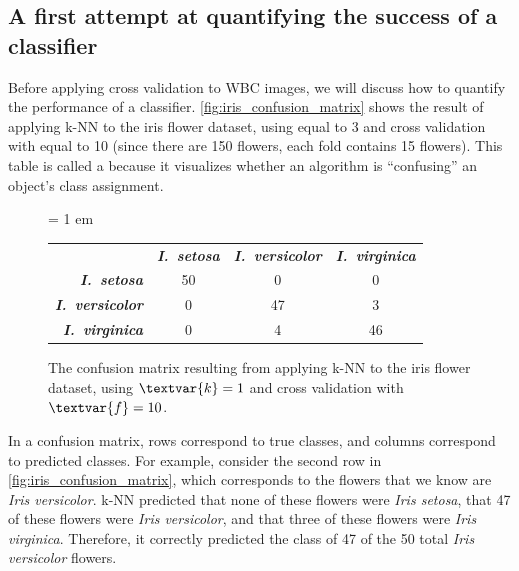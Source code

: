 \FloatBarrier
{}
\subsection{A first attempt at quantifying the success of a classifier}

Before applying cross validation to WBC images, we will discuss how to quantify the performance of a classifier. \autoref{fig:iris_confusion_matrix} shows the result of applying k-NN to the iris flower dataset, using  equal to 3 and cross validation with  equal to 10 (since there are 150 flowers, each fold contains 15 flowers). This table is called a  because it visualizes whether an algorithm is ``confusing'' an object's class assignment.\\

\begin{figure}[h]
\centering
\tabcolsep = 1 em
\mySfFamily
{}
\begin{tabular}{r c c c}
\rowcolor{gray!50}
& \textbf{\textit{I.~setosa}} & \textbf{\textit{I.~versicolor}} & \textbf{\textit{I.~virginica}} \\
\textbf{\textit{I.~setosa}} & 50 & \phantom{5}0 & \phantom{5}0 \\
\textbf{\textit{I.~versicolor}} & \phantom{5}0 & 47 & \phantom{5}3 \\
\textbf{\textit{I.~virginica}} & \phantom{5}0 & \phantom{5}4 & 46
\end{tabular}
\caption{The confusion matrix resulting from applying k-NN to the iris flower dataset, using $\textvar{k} = \text{1}$ and cross validation with $\textvar{f} = \text{10}$.}
\label{fig:iris_confusion_matrix}
\end{figure}

In a confusion matrix, rows correspond to true classes, and columns correspond to predicted classes. For example, consider the second row in \autoref{fig:iris_confusion_matrix}, which corresponds to the flowers that we know are \textit{Iris versicolor}. k-NN predicted that none of these flowers were \textit{Iris setosa}, that 47 of these flowers were \textit{Iris versicolor}, and that three of these flowers were \textit{Iris virginica}. Therefore, it correctly predicted the class of 47 of the 50 total \textit{Iris versicolor} flowers.\\


